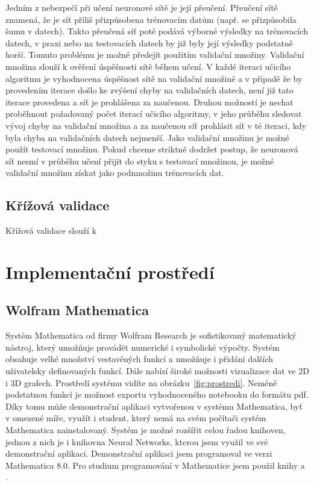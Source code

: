 \documentclass[11pt,twoside,a4paper]{book}
\begin{document}
Jedním z nebezpečí při učení neuronové sítě je její přeučení. Přeučení sítě znamená, že je síť příliš přizpůsobena trénovacím datům (např. se přizpůsobila šumu v datech). Takto přeučená síť poté podává výborné výsledky na trénovacích datech, v praxi nebo na testovacích datech by již byly její výsledky podstatně horší. Tomuto problému je možné předejít použitím validační množiny. Validační množina slouží k ověření úspěšnosti sítě během učení. V každé iteraci učicího algoritmu je vyhodnocena úspěšnost sítě na validační množině a v případě že by provedením iterace došlo ke zvýšení chyby na validačních datech, není již tato iterace provedena a síť je prohlášena za naučenou. Druhou možností je nechat proběhnout požadovaný počet iterací učicího algoritmy, v jeho průběhu sledovat vývoj chyby na validační množina a za naučenou síť prohlásit síť v té iteraci, kdy byla chyba na validačních datech nejmenší.
Jako validační množinu je možné použít testovací množinu. Pokud chceme striktně dodržet postup, že neuronová síť nesmí v průběhu učení přijít do styku s testovací množinou, je možné validační množinu získat jako podmnožinu trénovacích dat.
\section{Křížová validace}
Křížová validace slouží k  
\chapter{Implementační prostředí}
\section{Wolfram Mathematica}
Systém Mathematica od firmy Wolfram Research je sofistikovaný matematický nástroj, který umožňuje provádět numerické i symbolické výpočty. Systém obsahuje velké množství vestavěných funkcí a umožňuje i přidání dalších uživatelsky definovaných funkcí. Dále nabízí široké možnosti vizualizace dat ve 2D i 3D grafech. Prostředí systému vidíte na obrázku~\ref{fig:prostredi}. Neméně podstatnou funkcí je možnost exportu vyhodnoceného notebooku do formátu pdf. Díky tomu může demonstrační aplikaci vytvořenou v systému Mathematica, byť v omezené míře, využít i student, který nemá na svém počítači systém Mathematica nainstalovaný. Systém je možné rozšířit celou řadou knihoven, jednou z nich je i knihovna Neural Networks, kterou jsem využil ve své demonstrační aplikaci. Demonstrační aplikaci jsem programoval ve verzi Mathematica 8.0. Pro studium programování v Mathematice jsem použil knihy\cite{mathD} a \cite{mathP}.
\end{document}
